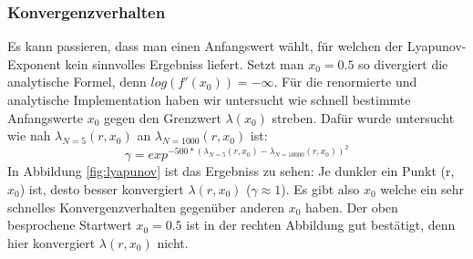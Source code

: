 \documentclass{scrartcl}
\begin{document}
\subsubsection{Konvergenzverhalten}
Es kann passieren, dass man einen Anfangswert wählt, für welchen der Lyapunov-Exponent kein sinnvolles Ergebniss liefert. Setzt man $x_0=0.5$ so divergiert die analytische Formel, denn $log(f'(x_0))=-\infty$.
Für die renormierte und analytische Implementation haben wir untersucht wie schnell bestimmte Anfangswerte $x_0$ gegen den Grenzwert $\lambda(x_0)$ streben. Dafür wurde untersucht wie nah $\lambda_{N=5}(r, x_0)$ an $\lambda_{N=1000}(r, x_0)$ ist:
\begin{equation}
    \gamma = exp^{-500 * (\lambda_{N=5}(r,x_0)
    - \lambda_{N=10000}(r,x_0))^2}
\end{equation}
In Abbildung \ref{fig:lyapunov} ist das Ergebniss zu sehen: Je dunkler ein Punkt (r, $x_0$) ist, desto besser konvergiert $\lambda(r, x_0)$ ($\gamma \approx 1$). 
Es gibt also $x_0$ welche ein sehr schnelles Konvergenzverhalten gegenüber anderen $x_0$ haben. Der oben besprochene Startwert $x_0=0.5$ ist in der rechten Abbildung gut bestätigt, denn hier konvergiert $\lambda(r, x_0)$ nicht. 
\end{document}
